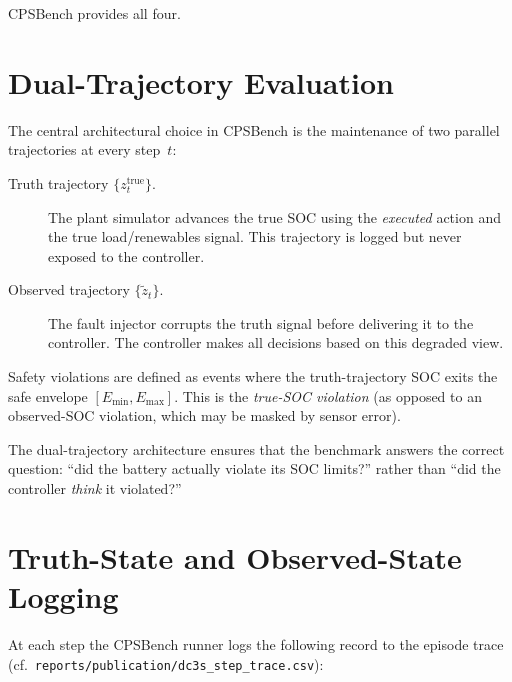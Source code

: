 CPSBench provides all four.

\section{Dual-Trajectory Evaluation}

The central architectural choice in CPSBench is the maintenance of two
parallel trajectories at every step~$t$:

\begin{description}
  \item[Truth trajectory $\{z_t^{\mathrm{true}}\}$.]
    The plant simulator advances the true SOC using the
    \emph{executed} action and the true load/renewables signal.  This
    trajectory is logged but never exposed to the controller.

  \item[Observed trajectory $\{\tilde{z}_t\}$.]
    The fault injector corrupts the truth signal before delivering it to
    the controller.  The controller makes all decisions based on this
    degraded view.
\end{description}

Safety violations are defined as events where the truth-trajectory SOC
exits the safe envelope $[E_{\min}, E_{\max}]$.  This is the
\emph{true-SOC violation} (as opposed to an observed-SOC violation, which
may be masked by sensor error).

The dual-trajectory architecture ensures that the benchmark answers the
correct question: ``did the battery actually violate its SOC limits?''
rather than ``did the controller \emph{think} it violated?''

\section{Truth-State and Observed-State Logging}

At each step the CPSBench runner logs the following record to the episode
trace (cf.\ \texttt{reports/publication/dc3s\_step\_trace.csv}):

